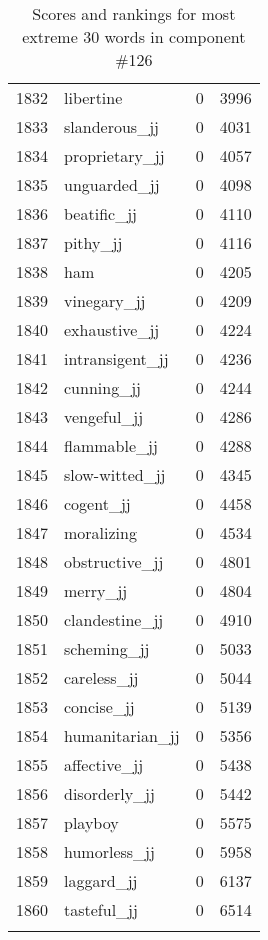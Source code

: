\begin{longtable}[!htbp]{| rlr@{.}l |}
    1832 & libertine & 0 & 3996 \\
    1833 & slanderous\_jj & 0 & 4031 \\
    1834 & proprietary\_jj & 0 & 4057 \\
    1835 & unguarded\_jj & 0 & 4098 \\
    1836 & beatific\_jj & 0 & 4110 \\
    1837 & pithy\_jj & 0 & 4116 \\
    1838 & ham & 0 & 4205 \\
    1839 & vinegary\_jj & 0 & 4209 \\
    1840 & exhaustive\_jj & 0 & 4224 \\
    1841 & intransigent\_jj & 0 & 4236 \\
    1842 & cunning\_jj & 0 & 4244 \\
    1843 & vengeful\_jj & 0 & 4286 \\
    1844 & flammable\_jj & 0 & 4288 \\
    1845 & slow-witted\_jj & 0 & 4345 \\
    1846 & cogent\_jj & 0 & 4458 \\
    1847 & moralizing & 0 & 4534 \\
    1848 & obstructive\_jj & 0 & 4801 \\
    1849 & merry\_jj & 0 & 4804 \\
    1850 & clandestine\_jj & 0 & 4910 \\
    1851 & scheming\_jj & 0 & 5033 \\
    1852 & careless\_jj & 0 & 5044 \\
    1853 & concise\_jj & 0 & 5139 \\
    1854 & humanitarian\_jj & 0 & 5356 \\
    1855 & affective\_jj & 0 & 5438 \\
    1856 & disorderly\_jj & 0 & 5442 \\
    1857 & playboy & 0 & 5575 \\
    1858 & humorless\_jj & 0 & 5958 \\
    1859 & laggard\_jj & 0 & 6137 \\
    1860 & tasteful\_jj & 0 & 6514 \\
    \hline
    \caption{Scores and rankings for most extreme 30 words in component \#126} \\
\end{longtable}
